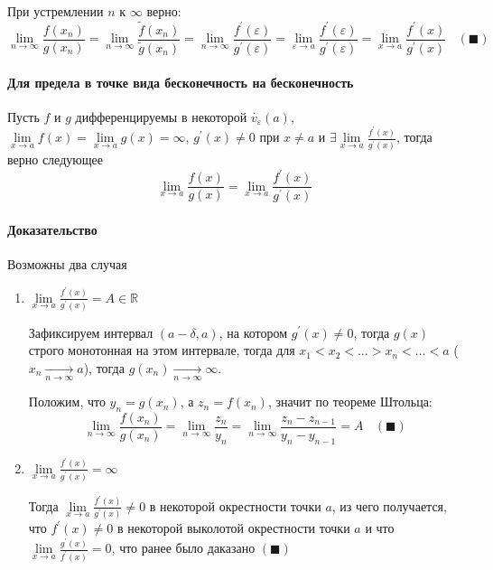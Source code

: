 \documentclass[class=article,a4paper,12pt,crop=false]{standalone}
\begin{document}
При устремлении $n$ к $\infty$ верно:
\begin{equation}
    \lim\limits_{n \rightarrow \infty}\frac{f(x_n)}{g(x_n)} = 
    \lim\limits_{n \rightarrow \infty}\frac{\tilde{f}(x_n)}{\tilde{g}(x_n)} =
    \lim\limits_{n \rightarrow \infty}\frac{f^{'}(\varepsilon)}{g^{'}(\varepsilon)} = 
    \lim\limits_{\varepsilon \rightarrow a}\frac{f^{'}(\varepsilon)}{g^{'}(\varepsilon)} =
    \lim\limits_{x \rightarrow a}\frac{f^{'}(x)}{g^{'}(x)} \:\:\:\: (\blacksquare)
\end{equation}

\paragraph{Для предела в точке вида бесконечность на бесконечность} Пусть $f$ и $g$ дифференцируемы в некоторой $\overset{\cdot}{v}_{\varepsilon}(a)$,
$\lim\limits_{x \rightarrow a}f(x) = \lim\limits_{x \rightarrow a}g(x) = \infty$,
$g^{'}(x) \neq 0$ при $x \neq a$ и $\exists \lim\limits_{x \rightarrow a}\frac{f^{'}(x)}{g^{'}(x)}$,
тогда верно следующее
\begin{equation}
    \lim\limits_{x \rightarrow a}\frac{f(x)}{g(x)} = \lim\limits_{x \rightarrow a}\frac{f^{'}(x)}{g^{'}(x)}
\end{equation}

\paragraph{Доказательство} Возможны два случая
\begin{enumerate}
    \item {
        $\lim\limits_{x \rightarrow a}\frac{f^{'}(x)}{g^{'}(x)} = A \in \mathbb{R}$
    }

    Зафиксируем интервал $(a - \delta, a)$, на котором $g^{'}(x) \neq 0$, тогда
    $g(x)$ строго монотонная на этом интервале, тогда для
    $x_1 < x_2 < \dots > x_n < \dots < a$ ($x_n \underset{n \rightarrow \infty}{\longrightarrow} a$),
    тогда $g(x_n) \underset{n \rightarrow \infty}{\longrightarrow} \infty$.

    Положим, что $y_n = g(x_n)$,  а $z_n = f(x_n)$, значит по теореме Штольца:
    \begin{equation}
        \lim\limits_{n \rightarrow \infty}\frac{f(x_n)}{g(x_n)} =
        \lim\limits_{n \rightarrow \infty}\frac{z_n}{y_n} = 
        \lim\limits_{n \rightarrow \infty}\frac{z_n - z_{n - 1}}{y_n - y_{n - 1}} = A \:\:\:\: (\blacksquare)
    \end{equation}

    \item $\lim\limits_{x \rightarrow a}\frac{f^{'}(x)}{g^{'}(x)} = \infty$
    
    Тогда $\lim\limits_{x \rightarrow a}\frac{f^{'}(x)}{g^{'}(x)} \neq 0$ в некоторой окрестности точки $a$,
    из чего получается, что $f^{'}(x) \neq 0$ в некоторой выколотой окрестности точки $a$ и что
    $\lim\limits_{x \rightarrow a}\frac{g^{'}(x)}{f^{'}(x)} = 0$, что ранее было даказано $(\blacksquare)$
\end{enumerate}
\end{document}
